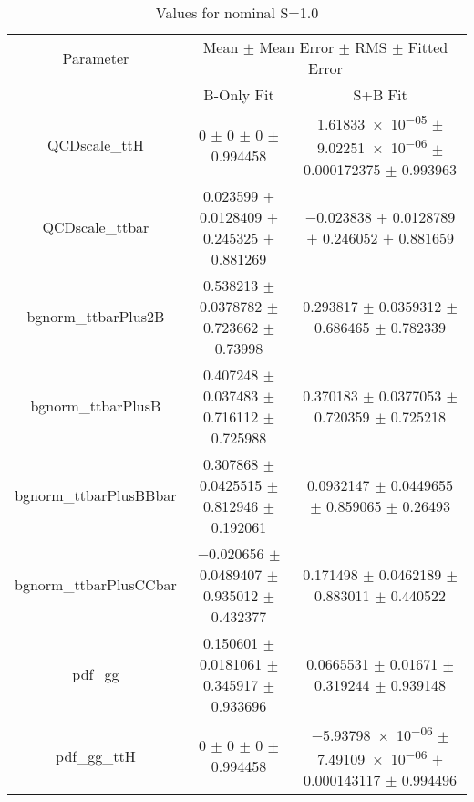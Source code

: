 \begin{table}
\centering
\caption{Values for nominal S=1.0}
\begin{tabular}{ccc}
\toprule
Parameter & \multicolumn{2}{c}{Mean $\pm$ Mean Error $\pm$ RMS $\pm$ Fitted Error}\\
 & B-Only Fit & S+B Fit\\
\midrule
QCDscale\_ttH & \num{0} $\pm$ \num{0} $\pm$ \num{0} $\pm$ \num{0.994458} & \num{1.61833e-05} $\pm$ \num{9.02251e-06} $\pm$ \num{0.000172375} $\pm$ \num{0.993963}\\
QCDscale\_ttbar & \num{0.023599} $\pm$ \num{0.0128409} $\pm$ \num{0.245325} $\pm$ \num{0.881269} & \num{-0.023838} $\pm$ \num{0.0128789} $\pm$ \num{0.246052} $\pm$ \num{0.881659}\\
bgnorm\_ttbarPlus2B & \num{0.538213} $\pm$ \num{0.0378782} $\pm$ \num{0.723662} $\pm$ \num{0.73998} & \num{0.293817} $\pm$ \num{0.0359312} $\pm$ \num{0.686465} $\pm$ \num{0.782339}\\
bgnorm\_ttbarPlusB & \num{0.407248} $\pm$ \num{0.037483} $\pm$ \num{0.716112} $\pm$ \num{0.725988} & \num{0.370183} $\pm$ \num{0.0377053} $\pm$ \num{0.720359} $\pm$ \num{0.725218}\\
bgnorm\_ttbarPlusBBbar & \num{0.307868} $\pm$ \num{0.0425515} $\pm$ \num{0.812946} $\pm$ \num{0.192061} & \num{0.0932147} $\pm$ \num{0.0449655} $\pm$ \num{0.859065} $\pm$ \num{0.26493}\\
bgnorm\_ttbarPlusCCbar & \num{-0.020656} $\pm$ \num{0.0489407} $\pm$ \num{0.935012} $\pm$ \num{0.432377} & \num{0.171498} $\pm$ \num{0.0462189} $\pm$ \num{0.883011} $\pm$ \num{0.440522}\\
pdf\_gg & \num{0.150601} $\pm$ \num{0.0181061} $\pm$ \num{0.345917} $\pm$ \num{0.933696} & \num{0.0665531} $\pm$ \num{0.01671} $\pm$ \num{0.319244} $\pm$ \num{0.939148}\\
pdf\_gg\_ttH & \num{0} $\pm$ \num{0} $\pm$ \num{0} $\pm$ \num{0.994458} & \num{-5.93798e-06} $\pm$ \num{7.49109e-06} $\pm$ \num{0.000143117} $\pm$ \num{0.994496}\\
\bottomrule
\end{tabular}
\end{table}